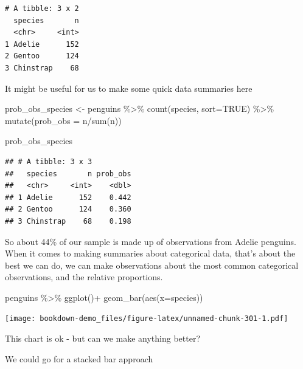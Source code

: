 \documentclass[
]{book}
\newenvironment{Shaded}{\begin{snugshade}}{\end{snugshade}}
\newcommand{\AttributeTok}[1]{\textcolor[rgb]{0.77,0.63,0.00}{#1}}
\newcommand{\ConstantTok}[1]{\textcolor[rgb]{0.00,0.00,0.00}{#1}}
\newcommand{\FunctionTok}[1]{\textcolor[rgb]{0.00,0.00,0.00}{#1}}
\newcommand{\NormalTok}[1]{#1}
\newcommand{\OtherTok}[1]{\textcolor[rgb]{0.56,0.35,0.01}{#1}}
\newcommand{\SpecialCharTok}[1]{\textcolor[rgb]{0.00,0.00,0.00}{#1}}
\begin{document}
\begin{verbatim}
# A tibble: 3 x 2
  species       n
  <chr>     <int>
1 Adelie      152
2 Gentoo      124
3 Chinstrap    68
\end{verbatim}

It might be useful for us to make some quick data summaries here

\begin{Shaded}
\begin{Highlighting}[]
\NormalTok{prob\_obs\_species }\OtherTok{\textless{}{-}}\NormalTok{ penguins }\SpecialCharTok{\%\textgreater{}\%} 
  \FunctionTok{count}\NormalTok{(species, }\AttributeTok{sort=}\ConstantTok{TRUE}\NormalTok{) }\SpecialCharTok{\%\textgreater{}\%} 
  \FunctionTok{mutate}\NormalTok{(}\AttributeTok{prob\_obs =}\NormalTok{ n}\SpecialCharTok{/}\FunctionTok{sum}\NormalTok{(n))}

\NormalTok{prob\_obs\_species}
\end{Highlighting}
\end{Shaded}

\begin{verbatim}
## # A tibble: 3 x 3
##   species       n prob_obs
##   <chr>     <int>    <dbl>
## 1 Adelie      152    0.442
## 2 Gentoo      124    0.360
## 3 Chinstrap    68    0.198
\end{verbatim}

So about 44\% of our sample is made up of observations from Adelie penguins. When it comes to making summaries about categorical data, that's about the best we can do, we can make observations about the most common categorical observations, and the relative proportions.

\begin{Shaded}
\begin{Highlighting}[]
\NormalTok{penguins }\SpecialCharTok{\%\textgreater{}\%} 
  \FunctionTok{ggplot}\NormalTok{()}\SpecialCharTok{+}
  \FunctionTok{geom\_bar}\NormalTok{(}\FunctionTok{aes}\NormalTok{(}\AttributeTok{x=}\NormalTok{species))}
\end{Highlighting}
\end{Shaded}

\texttt{[image: bookdown-demo\_files/figure-latex/unnamed-chunk-301-1.pdf]}

This chart is ok - but can we make anything better?

We could go for a stacked bar approach
\end{document}
